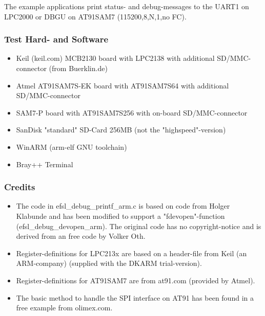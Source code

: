 The example applications print status- and 
debug-messages to the UART1 on LPC2000 or DBGU on AT91SAM7
(115200,8,N,1,no FC).


\subsubsection{Test Hard- and Software}
	\begin{itemize}

\item Keil (keil.com) MCB2130 board with LPC2138
with additional SD/MMC-connector (from Buerklin.de)

\item Atmel AT91SAM7S-EK board with AT91SAM7S64
with additional SD/MMC-connector

\item SAM7-P board with AT91SAM7S256
with on-board SD/MMC-connector

\item SanDisk "standard" SD-Card 256MB
(not the "highspeed"-version)

\item WinARM (arm-elf GNU toolchain)

\item Bray++ Terminal

	\end{itemize}


\subsubsection{Credits}

\begin{itemize}

\item The code in efsl_debug_printf_arm.c is 
based on code from Holger Klabunde
and has been modified to support
a "fdevopen"-function (efsl_debug_devopen_arm). 
The original code has no copyright-notice and
is derived from an free code by Volker Oth.

\item Register-definitions for LPC213x are 
based on a header-file from Keil (an ARM-company) 
(supplied with the DKARM trial-version).

\item Register-definitions for AT91SAM7 are from 
at91.com (provided by Atmel).

\item The basic method to handle the SPI interface
on AT91 has been found in a free example from 
olimex.com.

\end{itemize}
